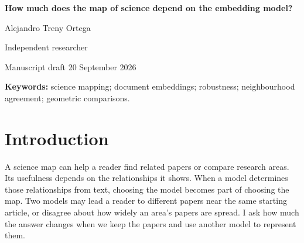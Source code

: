\documentclass[12pt]{article}
\begin{document}
\begin{center}
{\LARGE\bfseries How much does the map of science depend on the embedding model?\par}
\vspace{12pt}
{\large Alejandro Treny Ortega\par}
\smallskip
Independent researcher\par
\medskip
{\small Manuscript draft \textbullet{} 20 September 2026\par}
\end{center}

\begin{abstract}
Science maps describe relationships between papers. Text embedding models build these relationships by turning a paper's text into a list of numbers that gives it a position. Would another model give the same picture? I compare ten models using titles and abstracts of 500,000 publications from the OpenAlex bibliographic catalogue, published in 2000--2024 across 26 disciplines, including Medicine and Physics. Representing each discipline by its papers' average position produces similar arrangements across models, including when other papers are selected. Yet within a discipline and period, two models share, on average, only eight of the 25 papers closest to a given paper. Supplying titles alone also changes much of that list, with effects that vary between models. Models can also disagree about which discipline's papers are more spread out. When spread is measured through angles from a common reference point, moving that point can change the comparison even when selecting other papers does not. These checks distinguish agreement between models from stability to article selection. The broad arrangement can remain similar while answers about nearby papers and differences between disciplines depend on the model, the text it receives and how its output is processed.
\end{abstract}
\textbf{Keywords:} science mapping; document embeddings; robustness; neighbourhood agreement; geometric comparisons.

\section{Introduction}
A science map can help a reader find related papers or compare research areas. Its usefulness depends on the relationships it shows. When a model determines those relationships from text, choosing the model becomes part of choosing the map. Two models may lead a reader to different papers near the same starting article, or disagree about how widely an area's papers are spread. I ask how much the answer changes when we keep the papers and use another model to represent them.
\end{document}
